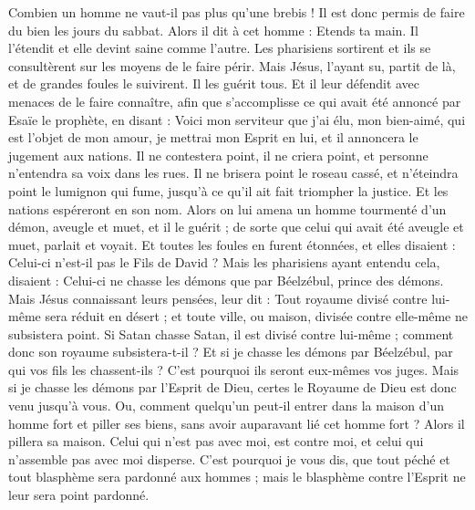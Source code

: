 \begin{multicols}{2}
Combien un homme ne vaut-il pas plus qu'une brebis ! Il est donc permis de faire du bien les jours du sabbat.
Alors il dit à cet homme : Etends ta main. Il l'étendit et elle devint saine comme l'autre.
Les pharisiens sortirent et ils se consultèrent sur les moyens de le faire périr.
Mais Jésus, l’ayant su, partit de là, et de grandes foules le suivirent. Il les guérit tous.
Et il leur défendit avec menaces de le faire connaître,
afin que s’accomplisse ce qui avait été annoncé par Esaïe le prophète, en disant :
Voici mon serviteur que j'ai élu, mon bien-aimé, qui est l'objet de mon amour, je mettrai mon Esprit en lui, et il annoncera le jugement aux nations.
Il ne contestera point, il ne criera point, et personne n'entendra sa voix dans les rues.
Il ne brisera point le roseau cassé, et n'éteindra point le lumignon qui fume, jusqu'à ce qu'il ait fait triompher la justice.
Et les nations espéreront en son nom.
Alors on lui amena un homme tourmenté d'un démon, aveugle et muet, et il le guérit ; de sorte que celui qui avait été aveugle et muet, parlait et voyait.
Et toutes les foules en furent étonnées, et elles disaient : Celui-ci n'est-il pas le Fils de David ?
Mais les pharisiens ayant entendu cela, disaient : Celui-ci ne chasse les démons que par Béelzébul, prince des démons.
Mais Jésus connaissant leurs pensées, leur dit : Tout royaume divisé contre lui-même sera réduit en désert ; et toute ville, ou maison, divisée contre elle-même ne subsistera point.
Si Satan chasse Satan, il est divisé contre lui-même ; comment donc son royaume subsistera-t-il ?
Et si je chasse les démons par Béelzébul, par qui vos fils les chassent-ils ? C’est pourquoi ils seront eux-mêmes vos juges.
Mais si je chasse les démons par l'Esprit de Dieu, certes le Royaume de Dieu est donc venu jusqu'à vous.
Ou, comment quelqu'un peut-il entrer dans la maison d'un homme fort et piller ses biens, sans avoir auparavant lié cet homme fort ? Alors il pillera sa maison.
Celui qui n'est pas avec moi, est contre moi, et celui qui n'assemble pas avec moi disperse.
C'est pourquoi je vous dis, que tout péché et tout blasphème sera pardonné aux hommes ; mais le blasphème contre l'Esprit ne leur sera point pardonné.

\end{multicols}
